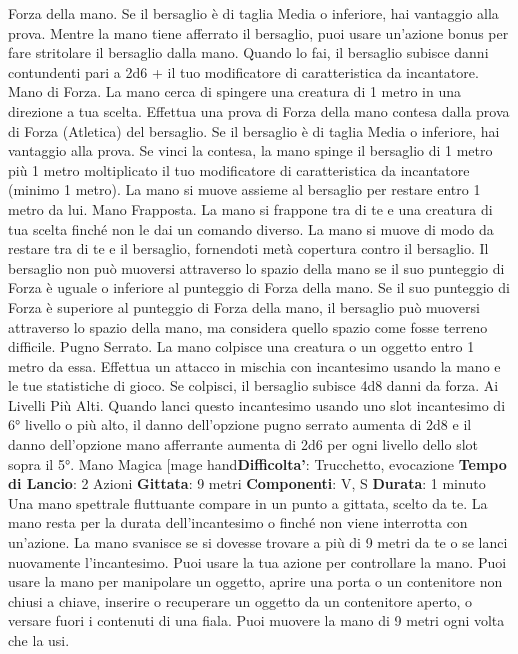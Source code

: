 \begin{multicols}{2}
Forza della mano. Se il bersaglio è di taglia Media o
inferiore, hai vantaggio alla prova. Mentre la mano tiene
afferrato il bersaglio, puoi usare un’azione bonus per
fare stritolare il bersaglio dalla mano. Quando lo fai, il
bersaglio subisce danni contundenti pari a 2d6 + il tuo
modificatore di caratteristica da incantatore.
Mano di Forza. La mano cerca di spingere una
creatura di 1 metro in una direzione a tua scelta.
Effettua una prova di Forza della mano contesa dalla
prova di Forza (Atletica) del bersaglio. Se il bersaglio è
di taglia Media o inferiore, hai vantaggio alla prova. Se
vinci la contesa, la mano spinge il bersaglio di 1 metro
più 1 metro moltiplicato il tuo modificatore di
caratteristica da incantatore (minimo 1 metro). La
mano si muove assieme al bersaglio per restare entro
1 metro da lui.
Mano Frapposta. La mano si frappone tra di te e una
creatura di tua scelta finché non le dai un comando
diverso. La mano si muove di modo da restare tra di te
e il bersaglio, fornendoti metà copertura contro il
bersaglio. Il bersaglio non può muoversi attraverso lo
spazio della mano se il suo punteggio di Forza è uguale
o inferiore al punteggio di Forza della mano. Se il suo
punteggio di Forza è superiore al punteggio di Forza
della mano, il bersaglio può muoversi attraverso lo
spazio della mano, ma considera quello spazio come
fosse terreno difficile.
Pugno Serrato. La mano colpisce una creatura o un
oggetto entro 1 metro da essa. Effettua un attacco in
mischia con incantesimo usando la mano e le tue
statistiche di gioco. Se colpisci, il bersaglio subisce 4d8
danni da forza.
Ai Livelli Più Alti. Quando lanci questo incantesimo
usando uno slot incantesimo di 6° livello o più alto, il
danno dell’opzione pugno serrato aumenta di 2d8 e il
danno dell’opzione mano afferrante aumenta di 2d6 per
ogni livello dello slot sopra il 5°.
Mano Magica
[mage hand\textbf{Difficolta'}:
Trucchetto, evocazione
\textbf{Tempo di Lancio}: 2 Azioni
\textbf{Gittata}: 9 metri
\textbf{Componenti}: V, S
\textbf{Durata}: 1 minuto
Una mano spettrale fluttuante compare in un punto a
gittata, scelto da te. La mano resta per la durata
dell’incantesimo o finché non viene interrotta con
un’azione. La mano svanisce se si dovesse trovare a
più di 9 metri da te o se lanci nuovamente
l’incantesimo.
Puoi usare la tua azione per controllare la mano. Puoi
usare la mano per manipolare un oggetto, aprire una
porta o un contenitore non chiusi a chiave, inserire o
recuperare un oggetto da un contenitore aperto, o
versare fuori i contenuti di una fiala. Puoi muovere la
mano di 9 metri ogni volta che la usi.

\end{multicols}
